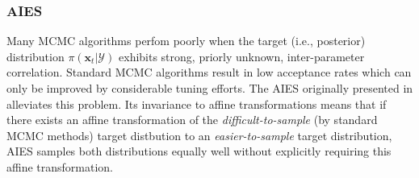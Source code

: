 \subsubsection{\acrfull{AIES}}
Many \acrshort{MCMC} algorithms perfom poorly when the target (i.e., posterior) distribution $\pi(\boldsymbol{x}_{t}|\mathcal{Y})$ exhibits strong, priorly unknown, inter-parameter correlation. Standard \acrshort{MCMC} algorithms result in low acceptance rates which can only be improved by considerable tuning efforts. The \acrshort{AIES} originally presented in \cite{goodman2010} alleviates this problem. Its invariance to affine transformations means that if there exists an affine transformation of the \textit{difficult-to-sample} (by standard \acrshort{MCMC} methods) target distbution to an \textit{easier-to-sample} target distribution, \acrshort{AIES} samples both distributions equally well without explicitly requiring this affine transformation.

